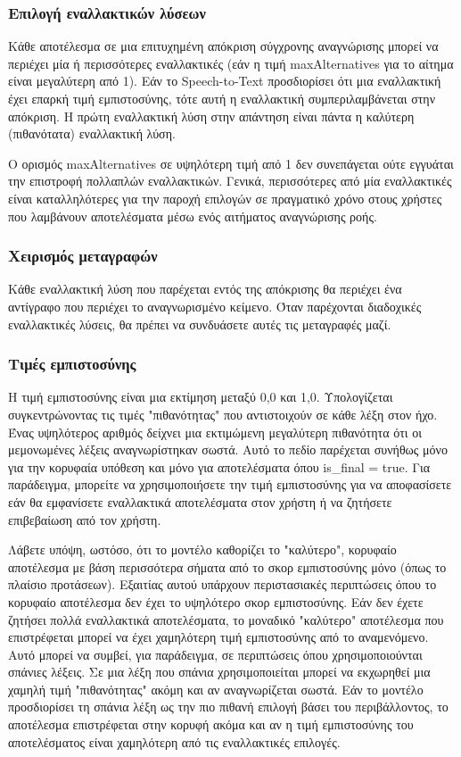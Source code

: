\documentclass[oneside, 12pt]{book}
\begin{document}
\subsubsection{Επιλογή εναλλακτικών λύσεων}
Κάθε αποτέλεσμα σε μια επιτυχημένη απόκριση σύγχρονης αναγνώρισης μπορεί να περιέχει μία ή περισσότερες εναλλακτικές (εάν η τιμή maxAlternatives για το αίτημα είναι μεγαλύτερη από 1). Εάν το Speech-to-Text προσδιορίσει ότι μια εναλλακτική έχει επαρκή τιμή εμπιστοσύνης, τότε αυτή η εναλλακτική συμπεριλαμβάνεται στην απόκριση. Η πρώτη εναλλακτική λύση στην απάντηση είναι πάντα η καλύτερη (πιθανότατα) εναλλακτική λύση.

Ο ορισμός maxAlternatives σε υψηλότερη τιμή από 1 δεν συνεπάγεται ούτε εγγυάται την επιστροφή πολλαπλών εναλλακτικών. Γενικά, περισσότερες από μία εναλλακτικές είναι καταλληλότερες για την παροχή επιλογών σε πραγματικό χρόνο στους χρήστες που λαμβάνουν αποτελέσματα μέσω ενός αιτήματος αναγνώρισης ροής.
\subsubsection{Χειρισμός μεταγραφών}
Κάθε εναλλακτική λύση που παρέχεται εντός της απόκρισης θα περιέχει ένα αντίγραφο που περιέχει το αναγνωρισμένο κείμενο. Όταν παρέχονται διαδοχικές εναλλακτικές λύσεις, θα πρέπει να συνδυάσετε αυτές τις μεταγραφές μαζί.
\subsubsection{Τιμές εμπιστοσύνης}
Η τιμή εμπιστοσύνης είναι μια εκτίμηση μεταξύ 0,0 και 1,0. Υπολογίζεται συγκεντρώνοντας τις τιμές "πιθανότητας" που αντιστοιχούν σε κάθε λέξη στον ήχο. Ένας υψηλότερος αριθμός δείχνει μια εκτιμώμενη μεγαλύτερη πιθανότητα ότι οι μεμονωμένες λέξεις αναγνωρίστηκαν σωστά. Αυτό το πεδίο παρέχεται συνήθως μόνο για την κορυφαία υπόθεση και μόνο για αποτελέσματα όπου is\_final = true. Για παράδειγμα, μπορείτε να χρησιμοποιήσετε την τιμή εμπιστοσύνης για να αποφασίσετε εάν θα εμφανίσετε εναλλακτικά αποτελέσματα στον χρήστη ή να ζητήσετε επιβεβαίωση από τον χρήστη.

Λάβετε υπόψη, ωστόσο, ότι το μοντέλο καθορίζει το "καλύτερο", κορυφαίο αποτέλεσμα με βάση περισσότερα σήματα από το σκορ εμπιστοσύνης μόνο (όπως το πλαίσιο προτάσεων). Εξαιτίας αυτού υπάρχουν περιστασιακές περιπτώσεις όπου το κορυφαίο αποτέλεσμα δεν έχει το υψηλότερο σκορ εμπιστοσύνης. Εάν δεν έχετε ζητήσει πολλά εναλλακτικά αποτελέσματα, το μοναδικό "καλύτερο" αποτέλεσμα που επιστρέφεται μπορεί να έχει χαμηλότερη τιμή εμπιστοσύνης από το αναμενόμενο. Αυτό μπορεί να συμβεί, για παράδειγμα, σε περιπτώσεις όπου χρησιμοποιούνται σπάνιες λέξεις. Σε μια λέξη που σπάνια χρησιμοποιείται μπορεί να εκχωρηθεί μια χαμηλή τιμή "πιθανότητας" ακόμη και αν αναγνωρίζεται σωστά. Εάν το μοντέλο προσδιορίσει τη σπάνια λέξη ως την πιο πιθανή επιλογή βάσει του περιβάλλοντος, το αποτέλεσμα επιστρέφεται στην κορυφή ακόμα και αν η τιμή εμπιστοσύνης του αποτελέσματος είναι χαμηλότερη από τις εναλλακτικές επιλογές.
\end{document}
